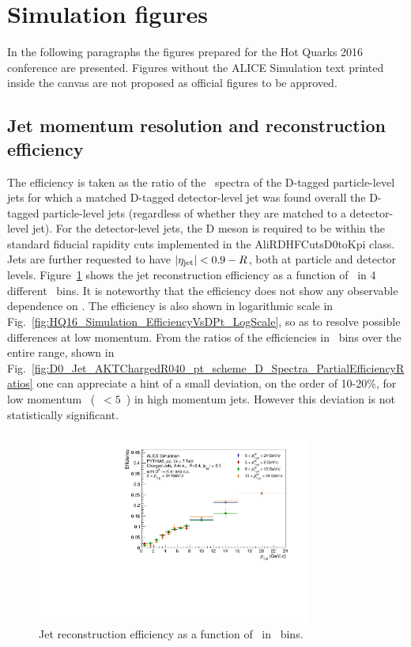 \section{Simulation figures}
In the following paragraphs the figures prepared for the Hot Quarks 2016 conference are presented. Figures without the ALICE Simulation
text printed inside the canvas are not proposed as official figures to be approved.
\subsection{Jet momentum resolution and reconstruction efficiency}
The efficiency is taken as the ratio of the \ptd\ spectra of the D-tagged particle-level jets for which a matched
D-tagged detector-level jet was found overall the D-tagged particle-level jets (regardless of whether they are matched to a detector-level jet).
For the detector-level jets, the D meson is required to be within the standard fiducial rapidity cuts implemented in the AliRDHFCutsD0toKpi class.
Jets are further requested to have $|\eta_{\rm jet}| < 0.9 - R$, both at particle and detector levels.
Figure~\ref{fig:HQ16_Simulation_EfficiencyVsDPt} shows the jet reconstruction efficiency as a function of \ptd\ in 4 different \ptchjet\ bins.
It is noteworthy that the efficiency does not show any observable dependence on \ptchjet.
The efficiency is also shown in logarithmic scale in Fig.~\ref{fig:HQ16_Simulation_EfficiencyVsDPt_LogScale}, so as to resolve possible
differences at low momentum. From the ratios of the efficiencies in \ptchjet\ bins over the entire range, shown in Fig.~\ref{fig:D0_Jet_AKTChargedR040_pt_scheme_D_Spectra_PartialEfficiencyRatios}
one can appreciate a hint of a small deviation, on the order of 10-20\%, for low momentum \Dzero\ (\ptd~$<5$~\GeVc) in high momentum jets. However this deviation is not statistically significant.
\begin{figure}[tbh]
\begin{center}
\includegraphics[width=0.8\textwidth]{img/HQ16_Simulation_EfficiencyVsDPt}
 \caption{Jet reconstruction efficiency as a function of \ptd\ in \ptchjet\ bins.} 
 \label{fig:HQ16_Simulation_EfficiencyVsDPt}
\end{center}
\end{figure}

